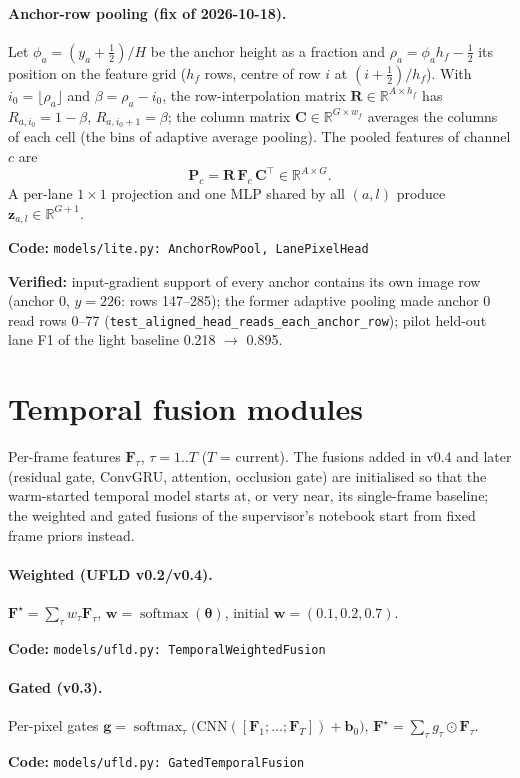 \documentclass[10pt,a4paper]{article}
\newcommand{\code}[1]{\texttt{\small #1}}
\newcommand{\impl}[1]{\par\noindent\textcolor{blue!50!black}{\small\textbf{Code:} \texttt{#1}}\par}
\newcommand{\verif}[1]{\par\noindent\textcolor{green!35!black}{\small\textbf{Verified:} #1}\par}
\newcommand{\R}{\mathbb{R}}
\newcommand{\softmax}{\operatorname{softmax}}
\theoremstyle{definition}
\begin{document}
\paragraph{Anchor-row pooling (fix of 2026-10-18).} Let $\phi_a=(y_a+\tfrac12)/H$ be the anchor height as a fraction
and $\rho_a=\phi_a h_f-\tfrac12$ its position on the feature grid ($h_f$ rows, centre of row $i$ at
$(i+\tfrac12)/h_f$). With $i_0=\lfloor\rho_a\rfloor$ and $\beta=\rho_a-i_0$, the row-interpolation matrix
$\bm R\in\R^{A\times h_f}$ has $R_{a,i_0}=1-\beta$, $R_{a,i_0+1}=\beta$; the column matrix
$\bm C\in\R^{G\times w_f}$ averages the columns of each cell (the bins of adaptive average pooling). The pooled
features of channel $c$ are
\begin{equation}
\bm P_c=\bm R\,\bm F_c\,\bm C^\top\in\R^{A\times G}.
\end{equation}
A per-lane $1{\times}1$ projection and one MLP shared by all $(a,l)$ produce $\bm z_{a,l}\in\R^{G+1}$.
\impl{models/lite.py: AnchorRowPool, LanePixelHead}
\verif{input-gradient support of every anchor contains its own image row (anchor 0, $y=226$: rows 147--285); the
former adaptive pooling made anchor 0 read rows 0--77 (\code{test\_aligned\_head\_reads\_each\_anchor\_row});
pilot held-out lane F1 of the light baseline 0.218 $\to$ 0.895.}

\section{Temporal fusion modules}
Per-frame features $\bm F_\tau$, $\tau=1..T$ ($T$ = current). The fusions added in v0.4 and later (residual gate, ConvGRU, attention, occlusion gate) are initialised so
that the warm-started temporal model starts at, or very near, its single-frame baseline; the weighted and gated
fusions of the supervisor's notebook start from fixed frame priors instead.

\paragraph{Weighted (UFLD v0.2/v0.4).} $\bm F^\star=\sum_\tau w_\tau\bm F_\tau$, $\bm w=\softmax(\bm\theta)$, initial
$\bm w=(0.1,0.2,0.7)$. \impl{models/ufld.py: TemporalWeightedFusion}

\paragraph{Gated (v0.3).} Per-pixel gates $\bm g=\softmax_\tau\big(\mathrm{CNN}([\bm F_1;\dots;\bm F_T])+\bm b_0\big)$,
$\bm F^\star=\sum_\tau g_\tau\odot\bm F_\tau$. \impl{models/ufld.py: GatedTemporalFusion}
\end{document}
